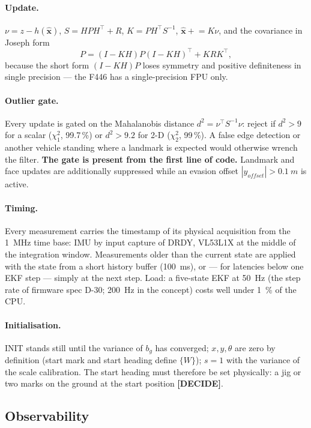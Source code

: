 \documentclass[11pt,a4paper]{article}
\newcommand{\mk}[2]{\textsf{\scriptsize\bfseries\colorbox{#1bg}{\color{#1}[#2]}}}
\newcommand{\DECIDE}{\mk{accent}{DECIDE}}
\newcommand{\T}{^{\!\top}}
\newcommand{\vect}[1]{\bm{#1}}
\begin{document}
\paragraph{Update.} $\nu=z-h(\hat{\vect x})$, $S=HPH\T+R$, $K=PH\T S^{-1}$,
$\hat{\vect x}\mathrel{+}=K\nu$, and the covariance in Joseph form
\begin{equation}
P=(I-KH)P(I-KH)\T+KRK\T,
\end{equation}
because the short form $(I-KH)P$ loses symmetry and positive definiteness in
single precision --- the F446 has a single-precision FPU only.

\paragraph{Outlier gate.} Every update is gated on the Mahalanobis distance
$d^2=\nu\T S^{-1}\nu$: reject if $d^2>9$ for a scalar ($\chi^2_1$, 99.7\,\%)
or $d^2>9.2$ for 2-D ($\chi^2_2$, 99\,\%). A false edge detection or another
vehicle standing where a landmark is expected would otherwise wrench the
filter. \textbf{The gate is present from the first line of code.} Landmark and
face updates are additionally suppressed while an evasion offset
$|y_{offset}|>\qty{0.1}{m}$ is active.

\paragraph{Timing.} Every measurement carries the timestamp of its physical
acquisition from the \qty{1}{MHz} time base: IMU by input capture of DRDY, VL53L1X
at the middle of the integration window. Measurements older than the current
state are applied with the state from a short history buffer (\qty{100}{ms}),
or --- for latencies below one EKF step --- simply at the next step. Load: a
five-state EKF at \qty{50}{Hz} (the step rate of firmware spec D-30; \qty{200}{Hz} in the concept) costs well under \qty{1}{\percent} of the CPU.

\paragraph{Initialisation.} INIT stands still until the variance of $b_g$ has
converged; $x,y,\theta$ are zero by definition (start mark and start heading
define $\{W\}$); $s=1$ with the variance of the scale calibration. The start
heading must therefore be set physically: a jig or two marks on the ground at
the start position \DECIDE.

\subsection{Observability}\label{sec:observability}
\end{document}
